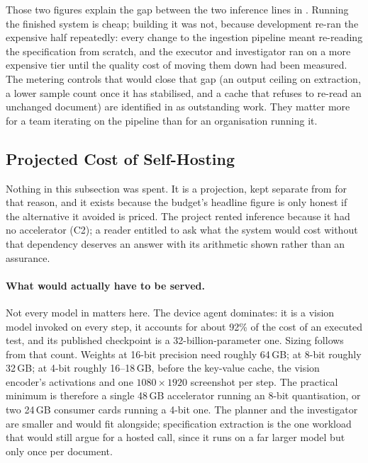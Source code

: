 Those two figures explain the gap between the two inference lines in
. Running the finished system is cheap; building it was not,
because development re-ran the expensive half repeatedly: every change to the ingestion pipeline meant re-reading the specification from scratch, and the
executor and investigator ran on a more expensive tier until the quality cost
of moving them down had been measured. The metering controls that would close that gap (an output ceiling on extraction, a lower sample count once it has
stabilised, and a cache that refuses to re-read an unchanged document) are identified in  as outstanding work. They matter more for a
team iterating on the pipeline than for an organisation running it.

\subsection{Projected Cost of Self-Hosting}
\label{sec:selfhost}

Nothing in this subsection was spent. It is a projection, kept separate from
 for that reason, and it exists because the budget's headline
figure is only honest if the alternative it avoided is priced. The project
rented inference because it had no accelerator (C2); a reader entitled to ask
what the system would cost without that dependency deserves an answer with its
arithmetic shown rather than an assurance.

\paragraph{What would actually have to be served.} Not every model in
 matters here. The device agent dominates: it is a vision
model invoked on every step, it accounts for about 92\% of the cost of an
executed test, and its published checkpoint is a 32-billion-parameter one.
Sizing follows from that count. Weights at 16-bit precision need roughly
64\,GB; at 8-bit roughly 32\,GB; at 4-bit roughly 16--18\,GB, before the
key-value cache, the vision encoder's activations and one
$1080\times1920$ screenshot per step. The practical minimum is therefore a
single 48\,GB accelerator running an 8-bit quantisation, or two 24\,GB consumer
cards running a 4-bit one. The planner and the investigator are smaller and
would fit alongside; specification extraction is the one workload that would
still argue for a hosted call, since it runs on a far larger model but only
once per document.

